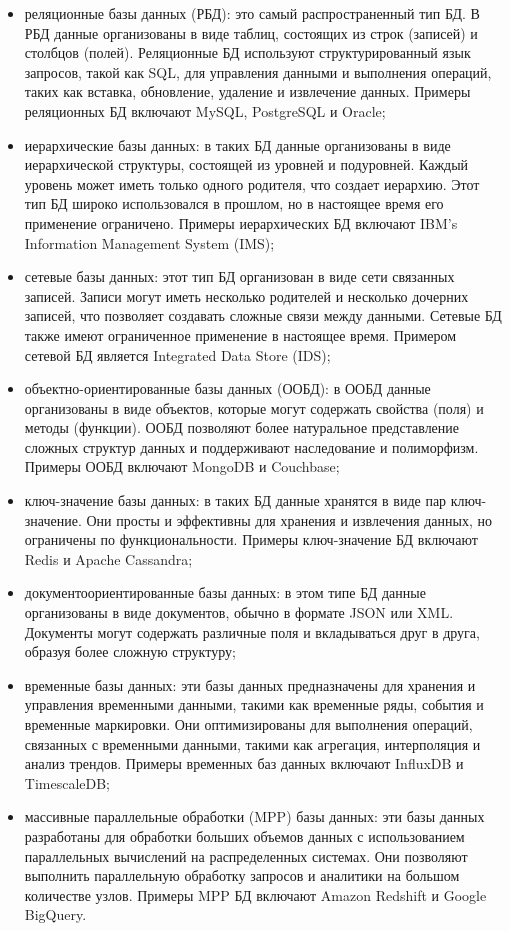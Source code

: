 \begin{itemize}
    \item реляционные базы данных (РБД): это самый распространенный тип БД. В РБД данные организованы в виде таблиц, состоящих из строк (записей) и столбцов (полей). Реляционные БД используют структурированный язык запросов, такой как SQL, для управления данными и выполнения операций, таких как вставка, обновление, удаление и извлечение данных. Примеры реляционных БД включают MySQL, PostgreSQL и Oracle;
    \item иерархические базы данных: в таких БД данные организованы в виде иерархической структуры, состоящей из уровней и подуровней. Каждый уровень может иметь только одного родителя, что создает иерархию. Этот тип БД широко использовался в прошлом, но в настоящее время его применение ограничено. Примеры иерархических БД включают IBM's Information Management System (IMS);
    \item сетевые базы данных: этот тип БД организован в виде сети связанных записей. Записи могут иметь несколько родителей и несколько дочерних записей, что позволяет создавать сложные связи между данными. Сетевые БД также имеют ограниченное применение в настоящее время. Примером сетевой БД является Integrated Data Store (IDS);
    \item объектно-ориентированные базы данных (ООБД): в ООБД данные организованы в виде объектов, которые могут содержать свойства (поля) и методы (функции). ООБД позволяют более натуральное представление сложных структур данных и поддерживают наследование и полиморфизм. Примеры ООБД включают MongoDB и Couchbase;
    \item ключ-значение базы данных: в таких БД данные хранятся в виде пар ключ-значение. Они просты и эффективны для хранения и извлечения данных, но ограничены по функциональности. Примеры ключ-значение БД включают Redis и Apache Cassandra;
    \item документоориентированные базы данных: в этом типе БД данные организованы в виде документов, обычно в формате JSON или XML. Документы могут содержать различные поля и вкладываться друг в друга, образуя более сложную структуру;
    \item временные базы данных: эти базы данных предназначены для хранения и управления временными данными, такими как временные ряды, события и временные маркировки. Они оптимизированы для выполнения операций, связанных с временными данными, такими как агрегация, интерполяция и анализ трендов. Примеры временных баз данных включают InfluxDB и TimescaleDB;
    \item массивные параллельные обработки (MPP) базы данных: эти базы данных разработаны для обработки больших объемов данных с использованием параллельных вычислений на распределенных системах. Они позволяют выполнить параллельную обработку запросов и аналитики на большом количестве узлов. Примеры MPP БД включают Amazon Redshift и Google BigQuery.
\end{itemize}
    
